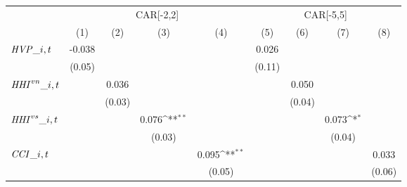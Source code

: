 {
\def\sym#1{\ifmmode^{#1}\else\(^{#1}\)\fi}
\begin{tabular}{l*{8}{c}}
\toprule
                    &\multicolumn{4}{c}{CAR[-2,2]}                                                          &\multicolumn{4}{c}{CAR[-5,5]}                                                          \\\cmidrule(lr){2-5}\cmidrule(lr){6-9}
                    &\multicolumn{1}{c}{(1)}         &\multicolumn{1}{c}{(2)}         &\multicolumn{1}{c}{(3)}         &\multicolumn{1}{c}{(4)}         &\multicolumn{1}{c}{(5)}         &\multicolumn{1}{c}{(6)}         &\multicolumn{1}{c}{(7)}         &\multicolumn{1}{c}{(8)}         \\
\midrule
${\it HVP}\_{i,t}$   &      -0.038         &                     &                     &                     &       0.026         &                     &                     &                     \\
                    &      (0.05)         &                     &                     &                     &      (0.11)         &                     &                     &                     \\
${\it HHI}^{vn}\_{i,t}$&                     &       0.036         &                     &                     &                     &       0.050         &                     &                     \\
                    &                     &      (0.03)         &                     &                     &                     &      (0.04)         &                     &                     \\
${\it HHI}^{vs}\_{i,t}$&                     &                     &       0.076\sym{**} &                     &                     &                     &       0.073\sym{*}  &                     \\
                    &                     &                     &      (0.03)         &                     &                     &                     &      (0.04)         &                     \\
${\it CCI}\_{i,t}$   &                     &                     &                     &       0.095\sym{**} &                     &                     &                     &       0.033         \\
                    &                     &                     &                     &      (0.05)         &                     &                     &                     &      (0.06)         \\

\end{tabular}}
